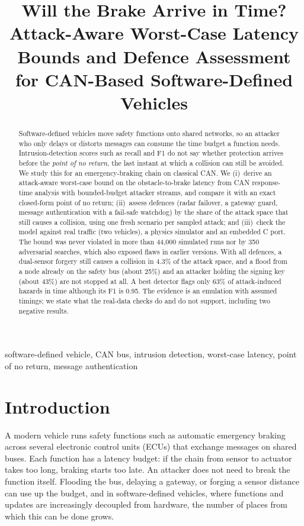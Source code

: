 \documentclass[conference]{IEEEtran}
\begin{document}
\title{Will the Brake Arrive in Time? Attack-Aware Worst-Case Latency Bounds and Defence Assessment for CAN-Based Software-Defined Vehicles}

\author{
}

\maketitle

\begin{abstract}
Software-defined vehicles move safety functions onto shared networks, so an attacker who only delays or distorts messages can consume the time budget a function needs. Intrusion-detection scores such as recall and F1 do not say whether protection arrives before the \emph{point of no return}, the last instant at which a collision can still be avoided. We study this for an emergency-braking chain on classical CAN. We (i)~derive an attack-aware worst-case bound on the obstacle-to-brake latency from CAN response-time analysis with bounded-budget attacker streams, and compare it with an exact closed-form point of no return; (ii)~assess defences (radar failover, a gateway guard, message authentication with a fail-safe watchdog) by the share of the attack space that still causes a collision, using one fresh scenario per sampled attack; and (iii)~check the model against real traffic (two vehicles), a physics simulator and an embedded C port. The bound was never violated in more than 44{,}000 simulated runs nor by 350 adversarial searches, which also exposed flaws in earlier versions. With all defences, a dual-sensor forgery still causes a collision in 4.3\% of the attack space, and a flood from a node already on the safety bus (about 25\%) and an attacker holding the signing key (about 43\%) are not stopped at all. A best detector flags only 63\% of attack-induced hazards in time although its F1 is 0.95. The evidence is an emulation with assumed timings; we state what the real-data checks do and do not support, including two negative results.
\end{abstract}

\begin{IEEEkeywords}
software-defined vehicle, CAN bus, intrusion detection, worst-case latency, point of no return, message authentication
\end{IEEEkeywords}

\section{Introduction}
A modern vehicle runs safety functions such as automatic emergency braking across several electronic control units (ECUs) that exchange messages on shared buses. Each function has a latency budget: if the chain from sensor to actuator takes too long, braking starts too late. An attacker does not need to break the function itself. Flooding the bus, delaying a gateway, or forging a sensor distance can use up the budget, and in software-defined vehicles, where functions and updates are increasingly decoupled from hardware, the number of places from which this can be done grows.
\end{document}
